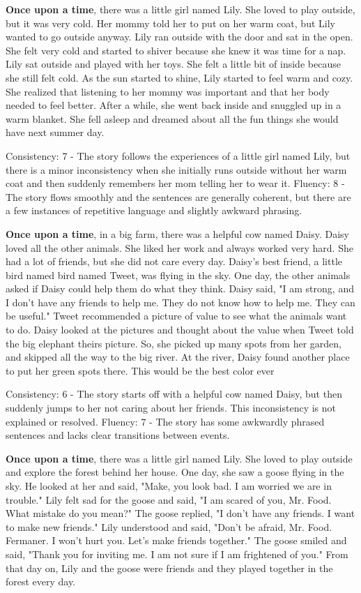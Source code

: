 \documentclass{article}
\begin{document}
\textbf{Once upon a time}, there was a little girl named Lily. She loved to play outside, but it was very cold. Her mommy told her to put on her warm coat, but Lily wanted to go outside anyway. Lily ran outside with the door and sat in the open. She felt very cold and started to shiver because she knew it was time for a nap. Lily sat outside and played with her toys. She felt a little bit of inside because she still felt cold. As the sun started to shine, Lily started to feel warm and cozy. She realized that listening to her mommy was important and that her body needed to feel better. After a while, she went back inside and snuggled up in a warm blanket. She fell asleep and dreamed about all the fun things she would have next summer day.

Consistency: 7 - The story follows the experiences of a little girl named Lily, but there is a minor inconsistency when she initially runs outside without her warm coat and then suddenly remembers her mom telling her to wear it.
Fluency: 8 - The story flows smoothly and the sentences are generally coherent, but there are a few instances of repetitive language and slightly awkward phrasing.

\textbf{Once upon a time}, in a big farm, there was a helpful cow named Daisy. Daisy loved all the other animals. She liked her work and always worked very hard. She had a lot of friends, but she did not care every day. Daisy's best friend, a little bird named bird named Tweet, was flying in the sky. One day, the other animals asked if Daisy could help them do what they think. Daisy said, "I am strong, and I don't have any friends to help me. They do not know how to help me. They can be useful." Tweet recommended a picture of value to see what the animals want to do. Daisy looked at the pictures and thought about the value when Tweet told the big elephant theirs picture. So, she picked up many spots from her garden, and skipped all the way to the big river. At the river, Daisy found another place to put her green spots there. This would be the best color ever

Consistency: 6 - The story starts off with a helpful cow named Daisy, but then suddenly jumps to her not caring about her friends. This inconsistency is not explained or resolved.
Fluency: 7 - The story has some awkwardly phrased sentences and lacks clear transitions between events.

\textbf{Once upon a time}, there was a little girl named Lily. She loved to play outside and explore the forest behind her house. One day, she saw a goose flying in the sky. He looked at her and said, "Make, you look bad. I am worried we are in trouble." Lily felt sad for the goose and said, "I am scared of you, Mr. Food. What mistake do you mean?" The goose replied, "I don't have any friends. I want to make new friends." Lily understood and said, "Don't be afraid, Mr. Food. Fermaner. I won't hurt you. Let's make friends together." The goose smiled and said, "Thank you for inviting me. I am not sure if I am frightened of you." From that day on, Lily and the goose were friends and they played together in the forest every day.
\end{document}
